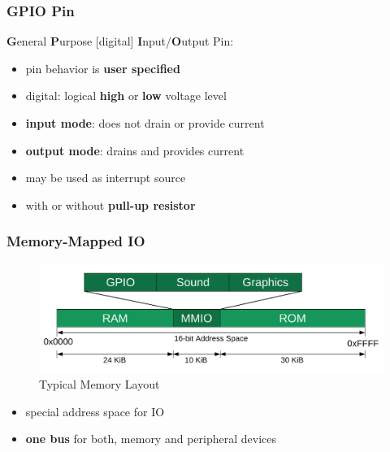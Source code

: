 \documentclass{beamer}
\renewcommand{\emph}[1]{\textbf{\textcolor{greeniot2}{#1}}}
\begin{document}
\begin{frame}
  \frametitle{GPIO Pin}
  
  \emph{G}eneral \emph{P}urpose [digital] \emph{I}nput/\emph{O}utput Pin:
  
  \begin{itemize}
  	\item pin behavior is \emph{user specified}
   \item digital: logical \emph{high} or \emph{low} voltage level
  \end{itemize} 
  
  \begin{itemize}
    \item \emph{input mode}: does not drain or provide current
    \item \emph{output mode}: drains and provides current
  \end{itemize}

  \begin{itemize}
		\item may be used as interrupt source
		\item with or without \emph{pull-up resistor}
	\end{itemize}
\end{frame}

\begin{frame}
  \frametitle{Memory-Mapped IO}
  
  \begin{figure}[H]
    \includegraphics[width=.8\textwidth]{images/mmio.pdf}
    \caption{Typical Memory Layout}
  \end{figure}
  
  \begin{itemize}
    \item special address space for IO
    \item \emph{one bus} for both, memory and peripheral devices
  \end{itemize} 
\end{frame}
\end{document}
